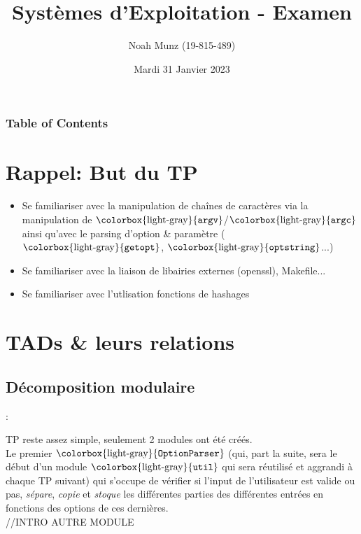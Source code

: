 \documentclass{beamer}
\title[Systèmes d'Exploitation: TP \num]{Systèmes d'Exploitation - Examen}
\subtitle{12X009 - TP\num}
\author[Noah Munz, Sciences Informatiques]{Noah Munz (19-815-489)}
\institute[]{Département d'Informatique \\ Université de Genève}
\date[Examen Oral]{Mardi 31 Janvier 2023}
\newcommand{\sn}{\secname}
\newcommand{\ssn}{\subsecname}
\newcommand{\code}[1]{$\mbox{\colorbox{light-gray}{\texttt{#1}}}$}
\begin{document}


\frame{\titlepage}

\begin{frame}
\frametitle{Table of Contents}
\tableofcontents
\end{frame}


%
%


%
\section{Rappel: But du TP}
\begin{frame}{\secname \subsecname}
%

\begin{itemize}
    \item Se familiariser avec la manipulation de chaînes de caractères via la manipulation de \code{argv}/\code{argc} ainsi qu'avec le parsing d'option \& paramètre (\code{getopt}, \code{optstring}...) \\
    
    \item Se familiariser avec la liaison de libairies externes (openssl), Makefile...\\
    
    \item Se familiariser avec l'utlisation fonctions de hashages
\end{itemize}

\end{frame}


%
%
\section{TADs \& leurs relations}
\subsection{Décomposition modulaire}
\begin{frame}{\sn : \ssn}
%

TP reste assez simple, seulement 2 modules ont été créés.\\ Le premier \code{OptionParser} (qui, part la suite, sera le début d'un module \code{util} qui sera réutilisé et aggrandi à chaque TP suivant) qui s'occupe de vérifier si l'input de l'utilisateur est valide ou pas, \textit{sépare}, \textit{copie} et \textit{stoque} les différentes parties des différentes entrées en fonctions des options de ces dernières.\\


\vspace{0.5cm}
//INTRO AUTRE MODULE

\end{frame}
\end{document}
